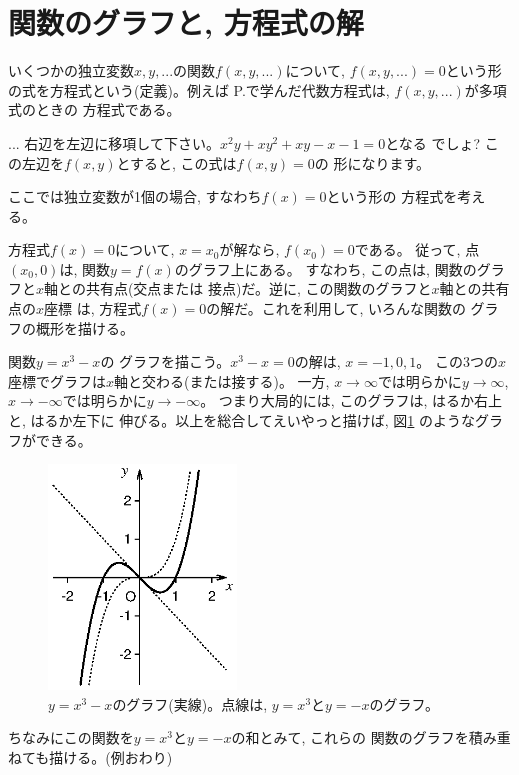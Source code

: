 \section{関数のグラフと, 方程式の解}

いくつかの独立変数$x, y, ...$の関数$f(x, y, ...)$について, 
$f(x, y, ...)=0$という形の式を方程式という(定義)。例えば
P.\pageref{sect:algeb_eq}で学んだ代数方程式は, $f(x, y, ...)$が多項式のときの
方程式である。

\begin{faq}{\small{}
... 右辺を左辺に移項して下さい。$x^2y+xy^2+xy-x-1=0$となる
でしょ? この左辺を$f(x, y)$とすると, この式は$f(x, y)=0$の
形になります。}\end{faq}

ここでは独立変数が1個の場合, すなわち$f(x)=0$という形の
方程式を考える。

方程式$f(x)=0$について, $x=x_0$が解なら, $f(x_0)=0$である。
従って, 点$(x_0, 0)$は, 関数$y=f(x)$のグラフ上にある。
すなわち, この点は, 関数のグラフと$x$軸との共有点(交点または
接点)だ。逆に, この関数のグラフと$x$軸との共有点の$x$座標
は, 方程式$f(x)=0$の解だ。これを利用して, いろんな関数の
グラフの概形を描ける。

\begin{exmpl}\label{exmpl:func_xxx_x} 関数$y=x^3-x$の
グラフを描こう。$x^3-x=0$の解は, $x=-1, 0, 1$。
この3つの$x$座標でグラフは$x$軸と交わる(または接する)。
一方, $x\rightarrow\infty$では明らかに$y\rightarrow\infty$, 
$x\rightarrow-\infty$では明らかに$y\rightarrow-\infty$。
つまり大局的には, このグラフは, はるか右上と, はるか左下に
伸びる。以上を総合してえいやっと描けば, 図\ref{fig:xxx-x}
のようなグラフができる。
\begin{figure}[h]
    \centering
    \includegraphics[width=5cm]{xxx-x.eps}
    \caption{$y=x^3-x$のグラフ(実線)。点線は, $y=x^3$と$y=-x$のグラフ。\label{fig:xxx-x}}
\end{figure}

ちなみにこの関数を$y=x^3$と$y=-x$の和とみて, これらの
関数のグラフを積み重ねても描ける。(例おわり)\end{exmpl}\mv

